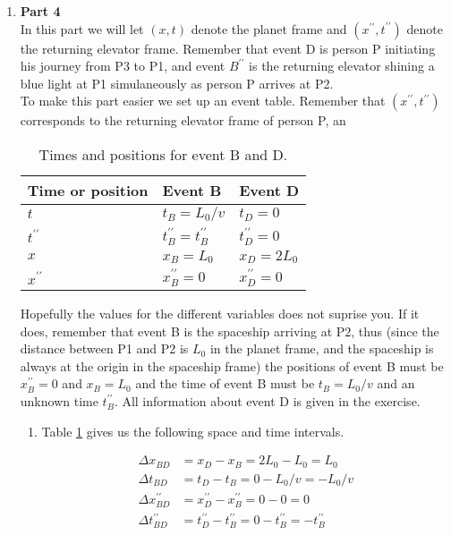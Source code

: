 \documentclass[a4paper,10pt,english]{article}
\begin{document}
\begin{enumerate}
\item \textbf{Part 4}\\
In this part we will let $(x,t)$ denote the planet frame and $(x^{\prime\prime},t^{\prime\prime})$ denote the returning elevator frame. Remember that event D is person P initiating his journey from P3 to P1, and event $B^{\prime\prime}$ is the returning elevator shining a blue light at P1 simulaneously as person P arrives at P2.
\\
To make this part easier we set up an event table. Remember that $(x^{\prime\prime},t^{\prime\prime})$ corresponds to the returning elevator frame of person P, an

\begin{table}[H]
  \begin{center}
    \begin{tabular}{| l | l | l |}
   	\hline
	 Time or position & Event B & Event D\\ \hline
	 $t$ & $t_{B}=L_{0}/v$ & $t_{D}=0$ \\ \hline
	 $t^{\prime\prime}$ & $t^{\prime\prime}_{B}=t^{\prime\prime}_{B}$ & $t_{D}^{\prime\prime}=0$\\ \hline
	 $x$ & $x_{B}=L_{0}$ & $x_{D}=2L_{0}$\\ \hline
	 $x^{\prime\prime}$ & $x^{\prime\prime}_{B}=0$ & $x_{D}^{\prime\prime}=0$\\ \hline
	\end{tabular}
    \caption{Times and positions for event B and D.}
    \label{table:ex_2A_8}
  \end{center}
\end{table}
\FloatBarrier

Hopefully the values for the different variables does not suprise you. If it does, remember that event B is the spaceship arriving at P2, thus (since the distance between P1 and P2 is $L_{0}$ in the planet frame, and the spaceship is always at the origin in the spaceship frame) the positions of event B must be $x^{\prime\prime}_{B}=0$ and $x_{B}=L_{0}$ and the time of event B must be $t_{B}=L_{0}/v$ and an unknown time $t^{\prime\prime}_{B}$. All information about event D is given in the exercise.

\begin{enumerate}

\item Table \ref{table:ex_2A_8} gives us the following space and time intervals.

\begin{align*}
\Delta x_{BD}&=x_{D}-x_{B}=2L_{0}-L_{0}=L_{0}\\
\Delta t_{BD}&=t_{D}-t_{B}=0-L_{0}/v=-L_{0}/v\\
\Delta x^{\prime\prime}_{BD}&=x^{\prime\prime}_{D}-x^{\prime\prime}_{B}=0-0=0\\
\Delta t^{\prime\prime}_{BD}&=t^{\prime\prime}_{D}-t_{B}^{\prime\prime}=0-t_{B}^{\prime\prime}=-t_{B}^{\prime\prime}
\end{align*}


\end{enumerate}
\end{enumerate}
\end{document}
